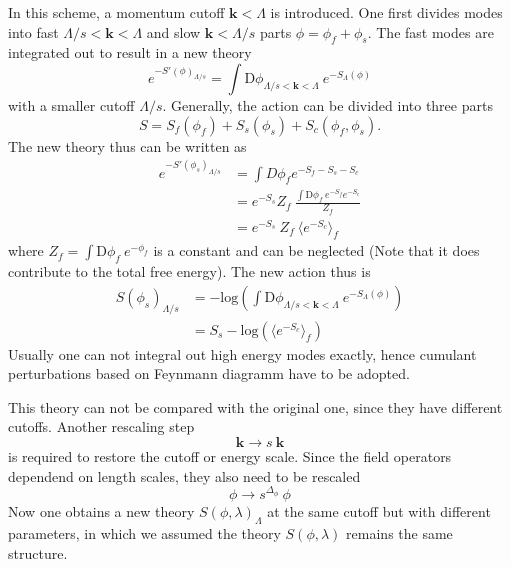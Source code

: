 \documentclass[submission, PhysLectNotes]{SciPost}
\begin{document}
In this scheme, a momentum cutoff $\boldsymbol{k}<\Lambda$ is introduced. One first divides modes into fast $\Lambda/s<\boldsymbol{k}<\Lambda$ and slow $\boldsymbol{k}<\Lambda/s$ parts $\phi = \phi_f +\phi_s$. The fast modes are integrated out to result in a new theory
\begin{equation}
    e^{-S'(\phi)_{\Lambda/s}} = \int \mathrm{D}\phi_{\Lambda/s<\boldsymbol{k}<\Lambda} \ e^{-S_{\Lambda}(\phi)}
\end{equation}
with a smaller cutoff $\Lambda/s$. Generally, the action can be divided into three parts
\begin{equation}
S = S_f(\phi_f) + S_s(\phi_s) + S_c(\phi_f,\phi_s).
\end{equation}
The new theory thus can be written as
\begin{equation}
\begin{aligned}
    e^{-S'(\phi_s)_{\Lambda/s}} &= \int D\phi_f e^{-S_f - S_s - S_c} \\
    &= e^{-S_s} Z_f \ \frac{\int \mathrm{D}\phi_f \ e^{-S_f} e^{-S_c}} {Z_f} \\
    &= e^{-S_s}\ Z_f \ \langle e^{-S_c} \rangle_f
\end{aligned}
\end{equation}
where $ Z_f = \int \mathrm{D}\phi_f \ e^{-\phi_f}$ is a constant and can be neglected (Note that it does contribute to the total free energy). The new action thus is
\begin{equation}
\begin{aligned}
S(\phi_s)_{\Lambda/s} &= -\mathrm{log} \left( \int \mathrm{D}\phi_{\Lambda/s<\boldsymbol{k}<\Lambda} \ e^{-S_{\Lambda}(\phi)} \right) \\
&= S_s - \mathrm{log} \left(\langle e^{-S_c} \rangle_f\right)
\end{aligned}
\end{equation}
Usually one can not integral out high energy modes exactly, hence cumulant perturbations based on Feynmann diagramm have to be adopted.

This theory can not be compared with the original one, since they have different cutoffs. Another rescaling step
\begin{equation}
    \boldsymbol{k} \rightarrow s\ \boldsymbol{k}
\end{equation}
is required to restore the cutoff or energy scale. Since the field operators dependend on length scales, they also need to be rescaled
\begin{equation}
     \phi \rightarrow s^{\Delta_\phi}\ \phi
\end{equation}
Now one obtains a new theory $S(\phi,\lambda)_\Lambda$ at the same cutoff but with different parameters, in which we assumed the theory $S(\phi,\lambda)$ remains the same structure.
\end{document}
